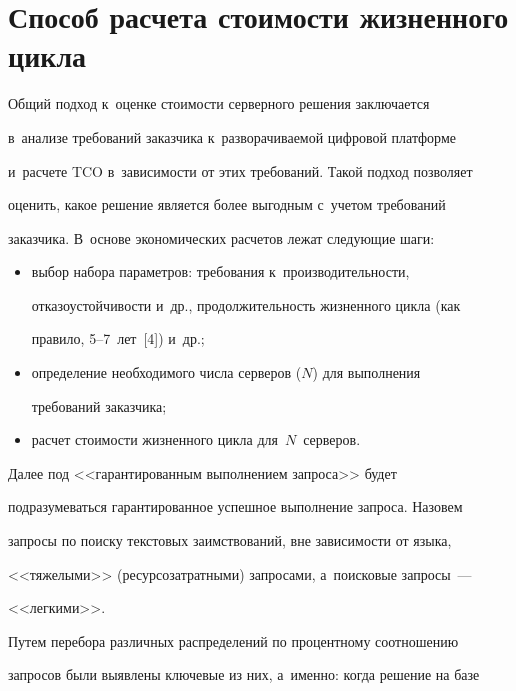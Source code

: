 \section{Способ расчета стоимости жизненного цикла}



\vspace*{-2pt}

     

  Общий подход к~оценке стоимости серверного решения заключается 

в~анализе требований заказчика к~разворачиваемой циф\-ро\-вой платформе 

и~расчете TCO в~зависимости от этих требований. Такой подход позволяет 

оценить, какое решение является более выгодным с~учетом требований 

заказчика. В~основе экономических расчетов лежат сле\-ду\-ющие шаги:

  \begin{itemize}

\item выбор набора параметров: требования к~производительности, 

отказоустойчивости и~др., про\-дол\-жи\-тель\-ность жизненного цик\-ла (как 

правило, 5--7~лет~[4]) и~др.;

\item определение необходимого чис\-ла серверов ($N$) для выполнения 

требований заказчика;

\item расчет стоимости жизненного цик\-ла для~$N$~серверов.

\end{itemize}

  

  Далее под <<гарантированным выполнением запроса>> будет 

подразумеваться гарантированное успешное выполнение запроса. Назовем 

запросы по поиску текс\-то\-вых заимствований, вне зависимости от языка, 

<<тяжелыми>> (ресурсозатратными) запросами, а~поисковые запросы~--- 

<<лег\-кими>>.

  

  Путем перебора различных распределений по процентному соотношению 

запросов были выявлены ключевые из них, а~именно: когда решение на базе 

